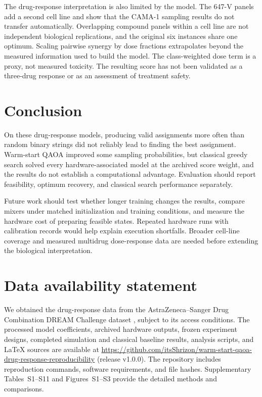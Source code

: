 \documentclass[utf8]{FrontiersinHarvard}
\begin{document}
The drug-response interpretation is also limited by the model. The 647-V panels add a second cell line and show that the CAMA-1 sampling results do not transfer automatically. Overlapping compound panels within a cell line are not independent biological replications, and the original six instances share one optimum. Scaling pairwise synergy by dose fractions extrapolates beyond the measured information used to build the model. The class-weighted dose term is a proxy, not measured toxicity. The resulting score has not been validated as a three-drug response or as an assessment of treatment safety.

\section{Conclusion}
On these drug-response models, producing valid assignments more often than random binary strings did not reliably lead to finding the best assignment. Warm-start QAOA improved some sampling probabilities, but classical greedy search solved every hardware-associated model at the archived score weight, and the results do not establish a computational advantage. Evaluation should report feasibility, optimum recovery, and classical search performance separately.

Future work should test whether longer training changes the results, compare mixers under matched initialization and training conditions, and measure the hardware cost of preparing feasible states. Repeated hardware runs with calibration records would help explain execution shortfalls. Broader cell-line coverage and measured multidrug dose-response data are needed before extending the biological interpretation.

\section*{Data availability statement}
We obtained the drug-response data from the AstraZeneca--Sanger Drug Combination DREAM Challenge dataset \citep{menden2019}, subject to its access conditions. The processed model coefficients, archived hardware outputs, frozen experiment designs, completed simulation and classical baseline results, analysis scripts, and LaTeX sources are available at \url{https://github.com/itsShrizon/warm-start-qaoa-drug-response-reproducibility} (release v1.0.0). The repository includes reproduction commands, software requirements, and file hashes. Supplementary Tables~S1--S11 and Figures~S1--S3 provide the detailed methods and comparisons.
\end{document}
